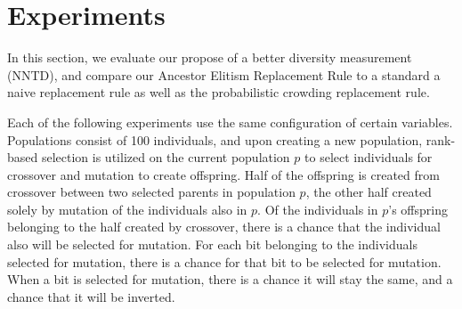 \section{Experiments}
In this section, we evaluate our propose of a better diversity measurement (NNTD), and compare our Ancestor Elitism Replacement Rule to a standard a naive replacement rule as well as the probabilistic crowding replacement rule.

Each of the following experiments use the same configuration of certain variables. Populations consist of \num{100} individuals, and upon creating a new population, rank-based selection is utilized on the current population $p$ to select individuals for crossover and mutation to create offspring. Half of the offspring is created from crossover between two selected parents in population $p$, the other half created solely by mutation of the individuals also in $p$. Of the individuals in $p$'s offspring belonging to the half created by crossover, there is a  chance that the individual also will be selected for mutation. For each bit belonging to the individuals selected for mutation, there is a  chance for that bit to be selected for mutation. When a bit is selected for mutation, there is a  chance it will stay the same, and a  chance that it will be inverted.



